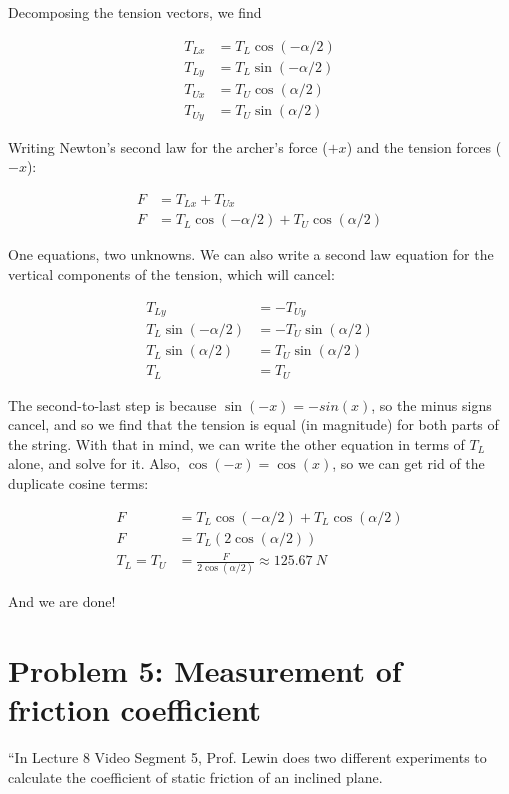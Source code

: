 \documentclass[8.01x]{subfiles}
\begin{document}
Decomposing the tension vectors, we find

\begin{align}
T_{Lx} &= T_L \cos (-\alpha/2)\\
T_{Ly} &= T_L \sin (-\alpha/2)\\
T_{Ux} &= T_U \cos (\alpha/2)\\
T_{Uy} &= T_U \sin (\alpha/2)
\end{align}

Writing Newton's second law for the archer's force ($+x$) and the tension forces ($-x$):

\begin{align}
F &= T_{Lx} + T_{Ux}\\
F &= T_L \cos (-\alpha/2) + T_U \cos (\alpha/2)
\end{align}

One equations, two unknowns. We can also write a second law equation for the vertical components of the tension, which will cancel:

\begin{align}
T_{Ly} &= -T_{Uy}\\
T_L \sin (-\alpha/2) &= -T_U \sin (\alpha/2)\\
T_L \sin (\alpha/2) &= T_U \sin (\alpha/2)\\
T_L &= T_U
\end{align}

The second-to-last step is because $\sin(-x) = -sin(x)$, so the minus signs cancel, and so we find that the tension is equal (in magnitude) for both parts of the string. With that in mind, we can write the other equation in terms of $T_L$ alone, and solve for it. Also, $\cos(-x) = \cos(x)$, so we can get rid of the duplicate cosine terms:

\begin{align}
F &= T_L \cos (-\alpha/2) + T_L \cos (\alpha/2)\\
F &= T_L (2\cos (\alpha/2))\\
T_L = T_U &= \frac{F}{2\cos (\alpha/2)} \approx \SI{125.67}{N}
\end{align}

And we are done!

\section{Problem 5: Measurement of friction coefficient}

``In Lecture 8 Video Segment 5, Prof. Lewin does two different experiments to calculate the coefficient of static friction of an inclined plane.
\end{document}

